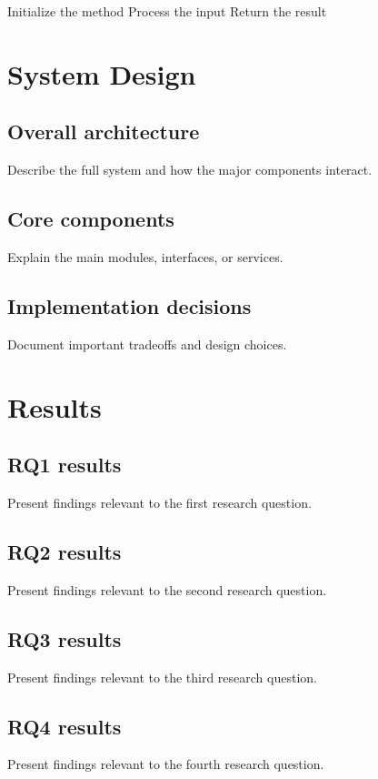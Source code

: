 \documentclass[PhD]{uclathes}
\begin{document}
\begin{algorithm}[H]
\caption{Example Algorithm Placeholder}
\DontPrintSemicolon
{}
Initialize the method\;
Process the input\;
Return the result\;
\end{algorithm}

\chapter{System Design}

\section{Overall architecture}
Describe the full system and how the major components interact.

\section{Core components}
Explain the main modules, interfaces, or services.

\section{Implementation decisions}
Document important tradeoffs and design choices.

\chapter{Results}

\section{RQ1 results}
Present findings relevant to the first research question.

\section{RQ2 results}
Present findings relevant to the second research question.

\section{RQ3 results}
Present findings relevant to the third research question.

\section{RQ4 results}
Present findings relevant to the fourth research question.
\end{document}
